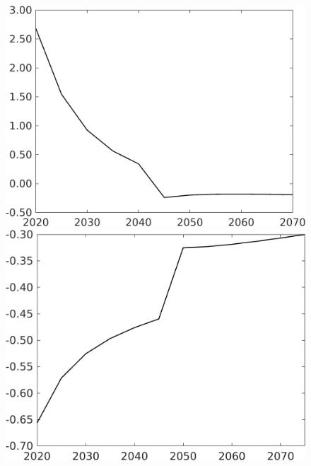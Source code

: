 \documentclass[12pt]{article}
\begin{document}
\begin{figure}[h!!]
\begin{minipage}[]{0.32\textwidth}
	\end{minipage}
	\begin{minipage}[]{0.32\textwidth}
		\includegraphics[width=1\textwidth]{../../codding_model/own_basedOnFried/optimalPol_010922_revision/figures/all_13Sept22/CompTaufPER_bytaul_Equlab_Reg0_gAn_spillover0_nsk0_xgr0_knspil0_sep0_LFlimit1_emsbase0_countec0_GovRev0_etaa0.79_lgd0.png}
	\end{minipage}	
	\begin{minipage}[]{0.32\textwidth}
		\includegraphics[width=1\textwidth]{../../codding_model/own_basedOnFried/optimalPol_010922_revision/figures/all_13Sept22/CompTaufPER_bytaul_Equlab_Reg0_Lf_spillover0_nsk0_xgr0_knspil0_sep0_LFlimit1_emsbase0_countec0_GovRev0_etaa0.79_lgd0.png}

\end{minipage}
\end{figure}
\end{document}

